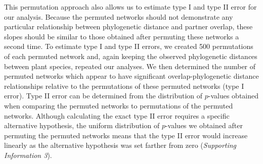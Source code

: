 \documentclass[12pt]{article}
\begin{document}
\begin{spacing}{1.5}
      This permutation approach also allows us to estimate type I and type II 
      error for our analysis. Because the permuted networks should not demonstrate any particular relationship between phylogenetic distance and partner overlap, these slopes should be similar to those obtained after permuting these networks a second time.
      To estimate type I and type II errors, we created 500 permutations of each 
      permuted network and, again keeping the observed phylogenetic distances 
      between plant species, repeated our analyses. We then determined the 
      number of permuted networks which appear to have significant 
      overlap-phylogenetic distance relationships relative to the permutations 
      of these permuted networks (type I error). Type II error can be determined
      from the distribution of $p$-values obtained when comparing the permuted 
      networks to permutations of the permuted networks. Although calculating 
      the exact type II error requires a specific alternative hypothesis, the 
      uniform distribution of $p$-values we obtained after permuting the permuted 
      networks means that the type II error would increase linearly as the 
      alternative hypothesis was set farther from zero (\emph{Supporting Information 3}).




\end{spacing}
\end{document}
